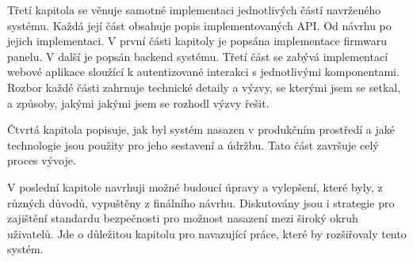 Třetí kapitola se věnuje samotné implementaci jednotlivých částí navrženého systému. Každá její část obsahuje popis implementovaných API. Od návrhu po jejich implementaci. V první části kapitoly je popsána implementace firmwaru panelu. V další je popsán backend systému. Třetí část se zabývá implementací webové aplikace sloužící k autentizované interakci s jednotlivými komponentami. Rozbor každé části zahrnuje technické detaily a výzvy, se kterými jsem se setkal, a způsoby, jakými jakými jsem se rozhodl výzvy řešit.

Čtvrtá kapitola popisuje, jak byl systém nasazen v produkčním prostředí a jaké technologie jsou použity pro jeho sestavení a údržbu. Tato část završuje celý proces vývoje.

V poslední kapitole navrhuji možné budoucí úpravy a vylepšení, které byly, z různých důvodů, vypuštěny z finálního návrhu. Diskutovány jsou i strategie pro zajištění standardu bezpečnosti pro možnost nasazení mezi široký okruh uživatelů. Jde o důležitou kapitolu pro navazující práce, které by rozšiřovaly tento systém.

